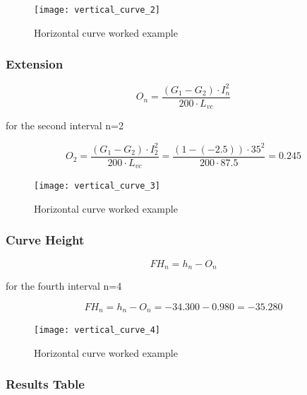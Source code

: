 \documentclass{bcrre_exam}
\begin{document}
\begin{figure}[h]
    \centering
    \texttt{[image: vertical\_curve\_2]}
    \caption{Horizontal curve worked example}
    \label{fig:hoz-cur-2}
\end{figure}

\subsubsection*{Extension}

\begin{equation}
    O_n=\frac{(G_1-G_2) \cdot I_n^2}{200 \cdot L_{vc}}
\end{equation}

for the second interval n=2

\begin{equation}
    O_2=\frac{(G_1-G_2) \cdot I_2^2}{200 \cdot L_{vc}} = \frac{(1-(-2.5)) \cdot 35^2}{200 \cdot 87.5} = 0.245
\end{equation}

\begin{figure}[h]
    \centering
    \texttt{[image: vertical\_curve\_3]}
    \caption{Horizontal curve worked example}
    \label{fig:hoz-cur-3}
\end{figure}

\subsubsection*{Curve Height}

\begin{equation}
    FH_n=h_n - O_n
\end{equation}

for the fourth interval n=4

\begin{equation}
    FH_n=h_n - O_n = -34.300-0.980=-35.280
\end{equation}

\begin{figure}[h]
    \centering
    \texttt{[image: vertical\_curve\_4]}
    \caption{Horizontal curve worked example}
    \label{fig:hoz-cur-4}
\end{figure}

\subsubsection*{Results Table}
\end{document}

